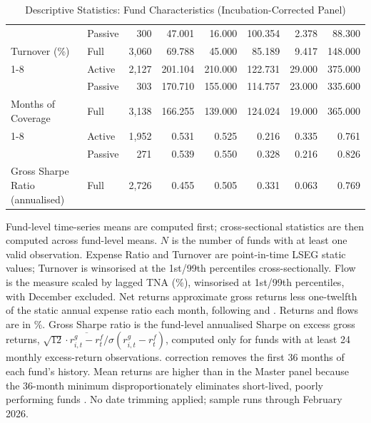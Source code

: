 \begin{table}[H]
{\begin{tabular}[t]{llrrrrrr}
 & Passive & 300 & 47.001 & 16.000 & 100.354 & 2.378 & 88.300\\

\multirow{-3}{*}{\raggedright\arraybackslash Turnover (\%)} & Full & 3,060 & 69.788 & 45.000 & 85.189 & 9.417 & 148.000\\
\cmidrule{1-8}
 & Active & 2,127 & 201.104 & 210.000 & 122.731 & 29.000 & 375.000\\

 & Passive & 303 & 170.710 & 155.000 & 114.757 & 23.000 & 335.600\\

\multirow{-3}{*}{\raggedright\arraybackslash Months of Coverage} & Full & 3,138 & 166.255 & 139.000 & 124.024 & 19.000 & 365.000\\
\cmidrule{1-8}
 & Active & 1,952 & 0.531 & 0.525 & 0.216 & 0.335 & 0.761\\

 & Passive & 271 & 0.539 & 0.550 & 0.328 & 0.216 & 0.826\\

\multirow{-3}{*}{\raggedright\arraybackslash Gross Sharpe Ratio (annualised)} & Full & 2,726 & 0.455 & 0.505 & 0.331 & 0.063 & 0.769\\
\bottomrule
\end{tabular}%
}
\setlength{\tabletempwidth}{\wd\tabletempbox}
\ifdim\tabletempwidth>\linewidth\setlength{\tabletempwidth}{\linewidth}\fi
\begin{minipage}{\tabletempwidth}
\captionsetup{width=\linewidth}
\caption{\label{tab:desc_stats}Descriptive Statistics: Fund Characteristics (Incubation-Corrected Panel)}
\ifdim\wd\tabletempbox>\linewidth
  \resizebox{\linewidth}{!}{\usebox{\tabletempbox}}
\else
  \usebox{\tabletempbox}
\fi
\par\medskip
\begin{singlespace}\footnotesize\noindent
Fund-level time-series means are computed first; cross-sectional statistics are then computed across fund-level means. $N$ is the number of funds with at least one valid observation. Expense Ratio and Turnover are point-in-time LSEG static values; Turnover is winsorised at the 1st/99th percentiles cross-sectionally. Flow is the \textcite{SirriTufano1998} measure scaled by lagged TNA (\%), winsorised at 1st/99th percentiles, with December excluded. Net returns approximate gross returns less one-twelfth of the static annual expense ratio each month, following \textcite{Carhart1997} and \textcite{Wermers2000}. Returns and flows are in \%. Gross Sharpe ratio is the fund-level annualised Sharpe on excess gross returns, $\sqrt{12}\cdot\overline{r^{g}_{i,t}-r^{f}_{t}}/\sigma(r^{g}_{i,t}-r^{f}_{t})$, computed only for funds with at least 24 monthly excess-return observations. \textcite{Evans2010} correction removes the first 36 months of each fund's history. Mean returns are higher than in the Master panel because the 36-month minimum disproportionately eliminates short-lived, poorly performing funds \parencite{Evans2010}. No date trimming applied; sample runs through February 2026.
\end{singlespace}
\end{minipage}
\end{table}

